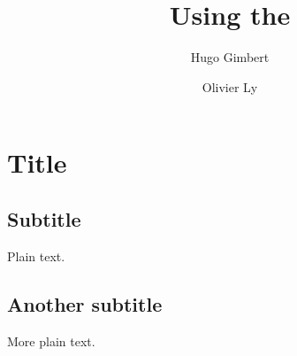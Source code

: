 \documentclass[a4paper]{article}
\title{Using the \rhobanp}
\author{Hugo Gimbert \and Olivier Ly}
\begin{document}
\maketitle


\section{Title}

\subsection{Subtitle}

Plain text.

\subsection{Another subtitle}

More plain text.
\end{document}
